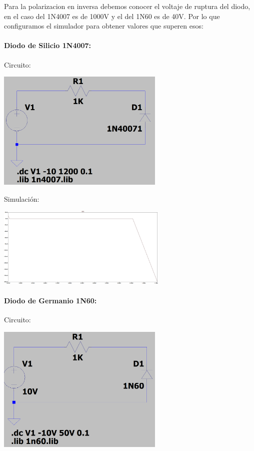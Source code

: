 Para la polarizacion en inversa debemos conocer el voltaje de ruptura del diodo, en el caso del 1N4007 es de 1000V y el del 1N60 es de 40V. Por lo que configuramos el simulador para obtener valores que superen esos:

\vspace{1cm}

\paragraph{Diodo de Silicio 1N4007:}

Circuito:
\vspace{0.5cm}

\includegraphics[width=8cm]{imagenes/Circuito3.PNG}

\vspace{0.5cm}

Simulación:

\includegraphics[width=8.2cm]{imagenes/simulacion3.png}\\

\paragraph{Diodo de Germanio 1N60:}

Circuito:

\vspace{0.5cm}

\includegraphics[width=8cm]{imagenes/Circuito4.png}\\

